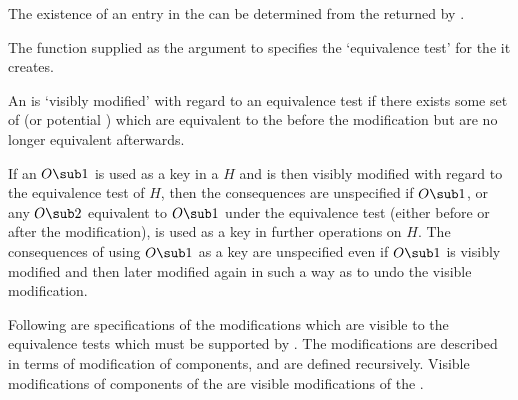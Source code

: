 \itemitem{--}
The existence of an entry in the  can be determined
from the  returned by .
\endlist               



\endsubsection%



The function supplied as the  argument to 
specifies the `equivalence test' for the  it creates.
 
An  is `visibly modified' with regard to an equivalence test
if there exists some set of  (or potential )
which are equivalent to the  before the modification but are
no longer equivalent afterwards.


If an  $O\sub 1$ is used as a key in a  $H$
and is then visibly modified with regard to the equivalence test of $H$,
then the consequences are unspecified if $O\sub 1$, or any 
$O\sub 2$ equivalent to $O\sub 1$ under the equivalence test (either before
or after the modification), is used as a key in further operations on $H$.
The consequences of using $O\sub 1$ as a key are unspecified 
even if $O\sub 1$ is visibly modified 
and then later modified again in such a way as 
to undo the visible modification.
 
Following are specifications of the modifications which are visible to the
equivalence tests which must be supported by .  The modifications
are described in terms of modification of components, and are defined
recursively.  Visible modifications of components of the  are 
visible modifications of the .

